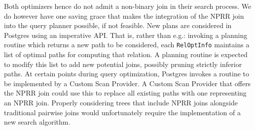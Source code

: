 Both optimizers hence do not admit a non-binary join in their search process. We do however have one saving grace that makes the integration of the NPRR
join into the query planner possible, if not feasible. New plans are considered in Postgres using an imperative API. That is,
rather than e.g.: invoking a planning routine which returns a new path
to be considered, each {\tt RelOptInfo} maintains a list of optimal paths
for computing that relation. A planning routine is expected to modify
this list to add new potential joins, possibly pruning strictly
inferior paths. At certain points during query optimization, Postgres
invokes a routine to be implemented by a Custom
Scan Provider. A Custom Scan Provider that offers the NPRR join could
use this to replace all existing paths with one representing an NPRR
join. Properly considering trees that include NPRR joins alongside
traditional pairwise joins would unfortunately require the
implementation of a new search algorithm.